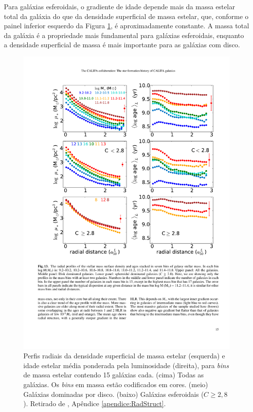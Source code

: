 Para galáxias esferoidais, o gradiente de idade depende mais da massa estelar
total da galáxia do que da densidade superficial de massa estelar, que, conforme
o painel inferior esquerdo da Figura \ref{fig:radStruct3}, é aproximadamente
constante. A massa total da galáxia é a propriedade mais fundamental para
galáxias esferoidais, enquanto a densidade superficial de massa é mais
importante para as galáxias com disco.


\begin{figure}
	\includegraphics[width=0.8\columnwidth]{figuras/radstruct-03}
	\caption[Perfis radiais para vários {\em bins} de massa estelar.]
	{Perfis radiais da densidade superficial de massa estelar (esquerda) e idade
	estelar média ponderada pela luminosidade (direita), para {\em bins} de
	massa estelar contendo 15 galáxias cada. (cima) Todas as galáxias. Os {\em
	bins} em massa estão codificados em cores. (meio) Galáxias dominadas por
	disco. (baixo) Galáxias esferoidais ($C \geq 2,8$). Retirado de \cite[figura
	13]{GonzalezDelgado2014a}, Apêndice \ref{apendice:RadStruct}.}
	\label{fig:radStruct3}
\end{figure}


